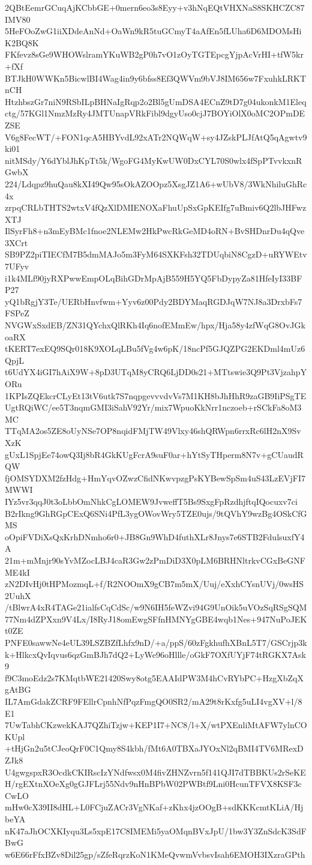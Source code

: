 2QBtEemrGCuqAjKCbbGE+0mern6eo3s8Eyy+v3hNqEQtVHXNaS8SKHCZC87IMV80
5HeFOoZwG1iiXDdeAnNd+OaWn9kR5tuGCmyT4aAfEn5fLUha6D6MDOMsHiK2BQ8K
FKfevz8sGe9WHOWslramYKuWB2gP0h7vO1zOyTGTEpcgYjpAcVrHI+tfW5kr+fXf
BTJkH0WWKn5BicwlBI4Wag4in9y6bfss8Ef3QWVm9bVJ8IM656w7FxuhkLRKTnCH
HtzhbszGr7niN9RSbILpBHNaIgRqp2o2Bl5gUmDSA4ECnZ9tD7g04ukonkM1Eleq
ctg/57KGl1NmzMzRy4JMTUnapVRkFibl9dgyUso0cjJ7BOYiOlX0oMC2OPmDEZSE
V6g8FecWT/+FON1qcA5HBYvdL92xATr2NQWqW+sy4JZskPLJfAtQ5qAgwtv9ki01
nitMSdy/Y6dYblJhKpTt5k/WgoFG4MyKwUW0DxCYL70S0wlx4fSpPTvvkxnRGwbX
224/Ldqpz9huQau8kXI49Qw95sOkAZOOpz5XsgJZ1A6+wUbV8/3WkNhiluGhRc4x
zrpqCRLbTHTS2wtxV4fQzXlDMIENOXaFhuUpSxGpKEIfg7uBmiv6Q2lbJHFwzXTJ
IlSyrFh8+n3mEyBMc1fnoe2NLEMw2HkPwcRkGeMD4oRN+BvSHDnrDu4qQve3XCrt
SB9PZ2piTIECfM7B5dmMAJo5m3FyM64SXKFsh32TDUqbiN8CgzD+uRYWEtv7UFyv
i1k4MLf90jyRXPwwEmpOLqBihGDrMpAjB559H5YQ5FbDypyZa81HfeIyI33BFP27
yQ1bRgjY3Te/UERbHnvfwm+Yyv6z00Pdy2BDYMaqRGDJqW7NJ8a3DrxbFs7FSPeZ
NVGWxSxdEB/ZN31QYchxQlRKh4Iq6nofEMmEw/hpx/Hja58y4zfWqG8OvJGkoaRX
tKERT7exEQ9SQr018K9XOLqLBu5fVg4w6pK/18ncPf5GJQZPG2EKDml4mUz6QpjL
t6UdYX4iGI7hAiX9W+8pD3UTqM8yCRQ6LjDD0s21+MTtswie3Q9Pt3VjzahpYORu
1KPIsZQEkcrCLyEt13tV6utk7S7nqpgevvvdvVs7M1KH8bJhHhR9zaGB9IiPSgTE
UgtRQiWC/ee5T3nqmGMI3iSahV92Yr/mix7WpuoKkNrr1nczoeb+rSCkFa8oM3MC
TTqMA2os5ZE8oUyNSe7OP8nqidFMjTW49Vlxy46shQRWpn6rrxRc6lH2nX9SvXzK
gUxL1SpjEe74owQ3Ij8bR4GkKUgFcrA9suF0ar+hYtSyTHperm8N7v+gCUaudRQW
fjOMSYDXM2fzHdg+HmYqvOZwzCfidNKwvpzgPsKYBewSpSm4uS43LzEVjFI7MWWI
IYz5vr3qqJ0t3oLbbOmNhkCgLOMEW9JvweffT5Bs9SxgFpRzdhjftqIQocuxv7ci
B2rIkng9GhRGpCExQ6SNi4PfL3ygOWovWry5TZE0ujs/9tQVhY9wzBg4OSkCfGMS
oOpiFVDiXsQxKrhDNmho6r0+JB8Gn9WhD4futhXLr8Jnys7e6STB2FdulsuxfY4A
21m+mMnjr90sYvMZocLBJ4caR3Gw2zPmDiD3X0pLM6BRHNltrkvCGxBeGNFME4kI
zN2DIvHj0tHPMozmqL+f/R2NOOmX9gCB7m5mX/Uuj/eXxhCYsnUVj/0wsHS2UuhX
/tBlwrA4xR4TAGe21ialfsCqCdSc/w9N6IH5feWZvi94G9UnOik5uVOzSqRSgSQM
77Nm4dZPXxn9V4Lx/I8RyJ18omEwgSFfnHMNYgGBE4wqb1Nes+947NuPoJEKt0ZE
PNFE0sawwNe4eUL39LSZBZfLhfx9nD/+a/ppS/60zFgkhufhXBnL5T7/GSCrjp3k
k+HlkcxQvIqvus6qzGmBJh7dQ2+LyWe96oHllle/oGkF7OXfUYjF74tRGKX7Ask9
f9C3moEdz2s7KMqtbWE21420Swy8otg5EAAIdPW3M4hCvRYbPC+HzgXbZqXgAtBG
IL7AmGdakZCRF9FEllrCpnhNfPqzFmgQO0SR2/mA29t8rKxfg5uLI4vgXV+l/8E1
7UwTabhCKzwekKAJ7QZhiTzjw+KEP1I7+NC8/l+X/wtPXEnliMtAFW7ylnCOKUpl
+tHjGn2u5tCJeoQrF0C1Qmy8S4kbh/fMt6A0TBXaJYOxNl2qBMI4TV6MRexDZJk8
U4gwgspxR3OcdkCKIRscIzYNdfwsx0M4fivZHNZvrn5f141QJI7dTBBKUs2rSeKE
H/rgEXtnXOeXg0gGJFLrj55Ndv9nHnBPbW02PWBtf9Lni0HcunTFVX8KSF3cCwLO
mHw0cX39II8dHL+L0FCjuZACr3VgNKaf+zKhx4jzOOgB+sdKKKcmtKLiA/HjbeYA
nK47aJhOCXKIyqu3Ls5xpE17C8IMEMi5yaOMqnBVxJpU/1bw3Y3ZnSdcK3SdFBwG
w6E66rFfxBZv8Dil25gp/sZfeRqrzKoN1KMeQvwmVvbsvIsah6EMOH3IXzraGPth
